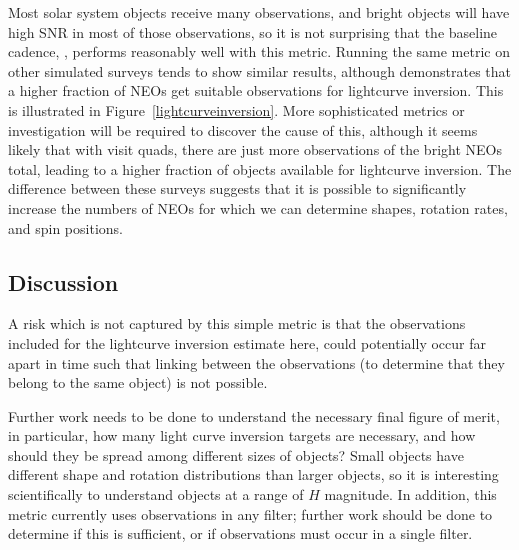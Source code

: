 Most solar system objects receive many observations, and bright
objects will have high SNR in most of those observations, so it is not
surprising that the baseline cadence, ,
performs reasonably well with this metric. Running the same metric on
other simulated surveys tends to show similar results, although
 demonstrates that a higher fraction
of NEOs get suitable observations for lightcurve inversion. This is
illustrated in Figure~\ref{lightcurveinversion}. More
sophisticated metrics or investigation will be required to discover
the cause of this, although it seems likely that with visit quads,
there are just more observations of the bright NEOs total, leading to
a higher fraction of objects available for lightcurve inversion. The
difference between these surveys suggests that it is possible to
significantly increase the numbers of NEOs for which we can determine
shapes, rotation rates, and spin positions.


\subsection{Discussion}
\label{sec:\secname:discussion}

A risk which is not captured by this simple metric is that the
observations included for the lightcurve inversion estimate here,
could potentially occur far apart in time such that linking between
the observations (to determine that they belong to the same object) is
not possible.

Further work needs to be done to understand the necessary final figure
of merit, in particular, how many light curve inversion targets are
necessary, and how should they be spread among different sizes of
objects? Small objects have different shape and
rotation distributions than larger objects, so it is interesting
scientifically to understand objects at a range of $H$ magnitude. In
addition, this metric currently uses observations in any filter;
further work should be done to determine if this is sufficient, or if
observations must occur in a single filter.


\navigationbar

